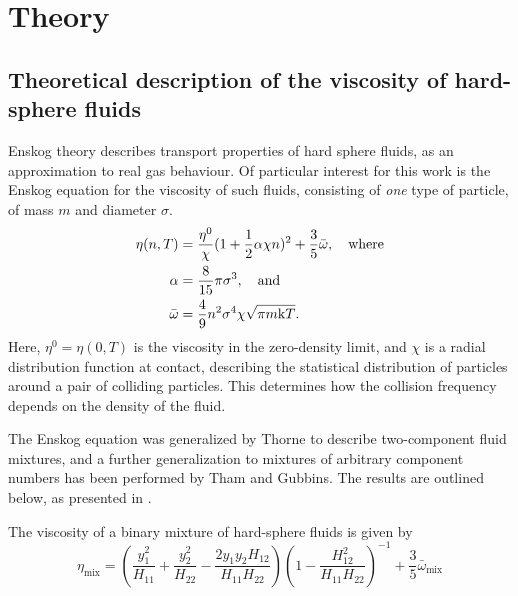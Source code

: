 \section{Theory}
\label{sec:theory}
\subsection{Theoretical description of the viscosity of hard-sphere fluids}
%
Enskog theory describes transport properties of hard sphere fluids, as an approximation to real gas behaviour.
Of particular interest for this work is the Enskog equation for the viscosity of such fluids,
consisting of \emph{one} type of particle, of mass $m$ and diameter $\sigma$.
\begin{align}
    \begin{split}
        \eta(n,T) 
            &= \frac{\eta^0}{\chi} (1+\frac{1}{2} \alpha \chi n)^2 + \frac{3}{5} \bar{\omega}, \quad \text{where}\\
        \alpha 
            &= \frac{8}{15} \pi \sigma^3, \quad \text{and} \\
        \bar{\omega} 
            &= \frac{4}{9} n^2 \sigma^4 \chi \sqrt{\pi m \mathrm{k} T}.
    \end{split}
\end{align}
Here, $\eta^0 = \eta(0, T)$ is the viscosity in the zero-density limit, 
and $\chi$ is a radial distribution function at contact, 
describing the statistical distribution of particles around a pair of colliding particles.
This determines how the collision frequency depends on the density of the fluid.

The Enskog equation was generalized by Thorne to describe two-component 
fluid mixtures\cite{ref:chapman:non_uniform_gases}, and a further 
generalization to mixtures of arbitrary component numbers has been 
performed by Tham and Gubbins\cite{ref:tham:fluid_mixtures}.
The results are outlined below, as presented in \cite{ref:pippo:composition_dependence}.

The viscosity of a binary mixture of hard-sphere fluids is given by
\begin{equation}
    \eta_{\text{mix}} 
        = \left(
            \frac{y_1^2}{H_{11}} + \frac{y_2^2}{H_{22}} - \frac{2 y_1 y_2 H_{12}}{H_{11} H_{22}}
        \right)
        \left(
            1 - \frac{H_{12}^2}{H_{11} H_{22}}
        \right)^{-1}
        + \frac{3}{5} \bar{\omega}_{\text{mix}}
\end{equation}



